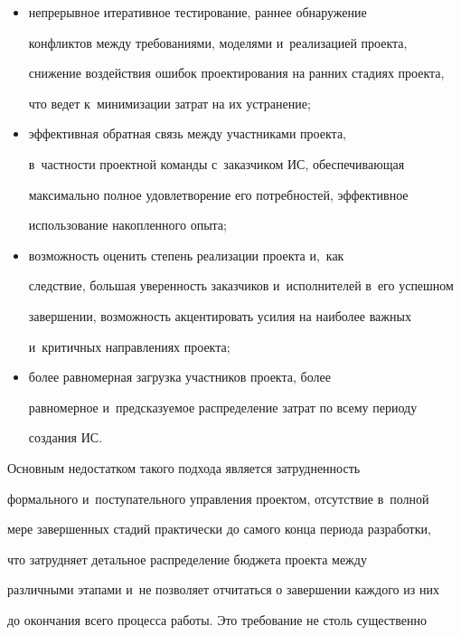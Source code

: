      \begin{itemize}


     \item непрерывное итеративное тестирование, раннее обнаружение 


конфликтов между требованиями, моделями и~реализацией проекта, 


снижение воздействия ошибок проектирования на ранних стадиях проекта, 


что ведет к~минимизации затрат на их устранение;


     \item эффективная обратная связь между участниками проекта, 


в~частности проектной команды с~заказчиком ИС, обеспечивающая 


максимально полное удовлетворение его потребностей, эффективное 


использование накопленного опыта;


     \item возможность оценить степень реализации проекта и,~как 


следствие, большая уверенность заказчиков и~исполнителей в~его успешном 


завершении, возможность акцентировать усилия на наиболее важных 


и~критичных направлениях проекта;


     \item более равномерная загрузка участников проекта, более 


равномерное и~предсказуемое распределение затрат по всему периоду 


создания ИС.


     \end{itemize}


     


     Основным недостатком такого подхода является затрудненность 


формального и~поступательного управления проектом, отсутствие в~полной 


мере завершенных стадий практически до самого конца периода разработки, 


что затрудняет детальное распределение бюджета проекта между 


различными этапами и~не позволяет отчитаться о завершении каждого из них 


до окончания всего процесса работы. Это требование не столь существенно 


